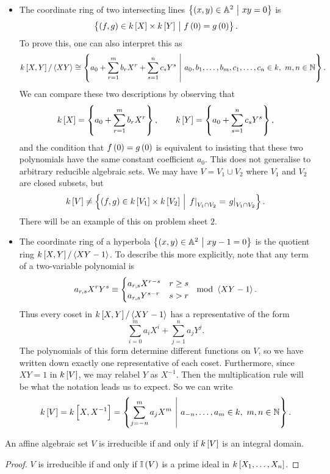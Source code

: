 \begin{example*}
\begin{itemize}
\item The coordinate ring of two intersecting lines $ \cbr{\br{x, y} \in \AA^2 \st xy = 0} $ is
$$ \cbr{\br{f, g} \in k\sbr{X} \times k\sbr{Y} \st f\br{0} = g\br{0}}. $$
To prove this, one can also interpret this as
$$ k\sbr{X, Y} / \abr{XY} \cong \cbr{a_0 + \sum_{r = 1}^m b_rX^r + \sum_{s = 1}^n c_sY^s \st a_0, b_1, \dots, b_m, c_1, \dots, c_n \in k, \ m, n \in \NN}. $$
We can compare these two descriptions by observing that
$$ k\sbr{X} = \cbr{a_0 + \sum_{r = 1}^m b_rX^r}, \qquad k\sbr{Y} = \cbr{a_0 + \sum_{s = 1}^n c_sY^s}, $$
and the condition that $ f\br{0} = g\br{0} $ is equivalent to insisting that these two polynomials have the same constant coefficient $ a_0 $. This does not generalise to arbitrary reducible algebraic sets. We may have $ V = V_1 \cup V_2 $ where $ V_1 $ and $ V_2 $ are closed subsets, but
$$ k\sbr{V} \ne \cbr{\br{f, g} \in k\sbr{V_1} \times k\sbr{V_2} \st \eval{f}_{V_1 \cap V_2} = \eval{g}_{V_1 \cap V_2}}. $$
There will be an example of this on problem sheet $ 2 $.
\item The coordinate ring of a hyperbola $ \cbr{\br{x, y} \in \AA^2 \st xy - 1 = 0} $ is the quotient ring $ k\sbr{X, Y} / \abr{XY - 1} $. To describe this more explicitly, note that any term of a two-variable polynomial is
$$ a_{r, s}X^rY^s \equiv
\begin{cases}
a_{r, s}X^{r - s} & r \ge s \\
a_{r, s}Y^{s - r} & s > r
\end{cases}
\mod \abr{XY - 1}.
$$
Thus every coset in $ k\sbr{X, Y} / \abr{XY - 1} $ has a representative of the form
$$ \sum_{i = 0}^m a_iX^i + \sum_{j = 1}^n a_jY^j. $$
The polynomials of this form determine different functions on $ V $, so we have written down exactly one representative of each coset. Furthermore, since $ XY = 1 $ in $ k\sbr{V} $, we may relabel $ Y $ as $ X^{-1} $. Then the multiplication rule will be what the notation leads us to expect. So we can write
$$ k\sbr{V} = k\sbr{X, X^{-1}} = \cbr{\sum_{j = -n}^m a_jX^m \st a_{-n}, \dots, a_m \in k, \ m, n \in \NN}. $$
\end{itemize}
\end{example*}

\begin{lemma}
An affine algebraic set $ V $ is irreducible if and only if $ k\sbr{V} $ is an integral domain.
\end{lemma}

\begin{proof}
$ V $ is irreducible if and only if $ \II\br{V} $ is a prime ideal in $ k\sbr{X_1, \dots, X_n} $.
\end{proof}

